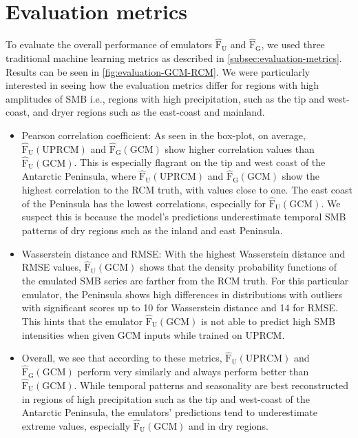 \documentclass[a4paper,11pt,oneside]{report}
\begin{document}
\section{Evaluation metrics}
To evaluate the overall performance of emulators $\mathrm{\hat{F}_{U}}$ and $\mathrm{\hat{F}_{G}}$, we used three traditional machine learning metrics as described in \autoref{subsec:evaluation-metrics}. Results can be seen in \autoref{fig:evaluation-GCM-RCM}. We were particularly interested in seeing how the evaluation metrics differ for regions with high amplitudes of SMB i.e., regions with high precipitation, such as the tip and west-coast, and dryer regions such as the east-coast and mainland. 
\begin{itemize}
    \item Pearson correlation coefficient: As seen in the box-plot, on average, $\mathrm{\hat{F}_{U}(UPRCM)}$ and $\mathrm{\hat{F}_{G}(GCM)}$ show higher correlation values than $\mathrm{\hat{F}_{U}(GCM)}$. This is especially flagrant on the tip and west coast of the Antarctic Peninsula, where $\mathrm{\hat{F}_{U}(UPRCM)}$ and $\mathrm{\hat{F}_{G}(GCM)}$ show the highest correlation to the RCM truth, with values close to one. The east coast of the Peninsula has the lowest correlations, especially for $\mathrm{\hat{F}_{U}(GCM)}$. We suspect this is because the model's predictions underestimate temporal SMB patterns of dry regions such as the inland and east Peninsula. 
    \item Wasserstein distance and RMSE: With the highest Wasserstein distance and RMSE values, $\mathrm{\hat{F}_{U}(GCM)}$ shows that the density probability functions of the emulated SMB series are farther from the RCM truth. For this particular emulator, the Peninsula shows high differences in distributions with outliers with significant scores up to 10 for Wasserstein distance and 14 for RMSE. This hints that the emulator $\mathrm{\hat{F}_{U}(GCM)}$ is not able to predict high SMB intensities when given GCM inputs while trained on UPRCM.   
    \item Overall, we see that according to these metrics, $\mathrm{\hat{F}_{U}(UPRCM)}$ and $\mathrm{\hat{F}_{G}(GCM)}$ perform very similarly and always perform better than $\mathrm{\hat{F}_{U}(GCM)}$. While temporal patterns and seasonality are best reconstructed in regions of high precipitation such as the tip and west-coast of the Antarctic Peninsula, the emulators' predictions tend to underestimate extreme values, especially $\mathrm{\hat{F}_{U}(GCM)}$ and in dry regions. 
\end{itemize}
\end{document}
